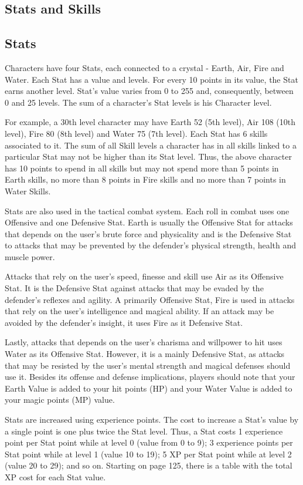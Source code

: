 \begin{multicols}{2}
\section{Stats and Skills}
\subsection{Stats}
Characters have four Stats, each connected
to a crystal - Earth, Air, Fire and Water. Each Stat
has a value and levels. For every 10 points in its
value, the Stat earns another level. Stat's value
varies from 0 to 255 and, consequently, between 0
and 25 levels. The sum of a character’s Stat levels
is his Character level.

For example, a 30th level character may
have Earth 52 (5th level), Air 108 (10th level), Fire
80 (8th level) and Water 75 (7th level). Each Stat
has 6 skills associated to it. The sum of all Skill
levels a character has in all skills linked to a
particular Stat may not be higher than its Stat level.
Thus, the above character has 10 points to spend
in all skills but may not spend more than 5 points
in Earth skills, no more than 8 points in Fire skills
and no more than 7 points in Water Skills.

Stats are also used in the tactical combat
system. Each roll in combat uses one Offensive
and one Defensive Stat. Earth is usually the
Offensive Stat for attacks that depends on the
user's brute force and physicality and is the
Defensive Stat to attacks that may be prevented by
the defender's physical strength, health and
muscle power.

Attacks that rely on the user's speed,
finesse and skill use Air as its Offensive Stat. It is
the Defensive Stat against attacks that may be
evaded by the defender's reflexes and agility. A
primarily Offensive Stat, Fire is used in attacks
that rely on the user's intelligence and magical
ability. If an attack may be avoided by the
defender's insight, it uses Fire as it Defensive Stat.

Lastly, attacks that depends on the user's
charisma and willpower to hit uses Water as its
Offensive Stat. However, it is a mainly Defensive
Stat, as attacks that may be resisted by the user's
mental strength and magical defenses should use
it. Besides its offense and defense implications,
players should note that your Earth Value is added
to your hit points (HP) and your Water Value is
added to your magic points (MP) value.

Stats are increased using experience
points. The cost to increase a Stat's value by a
single point is one plus twice the Stat level. Thus, a
Stat costs 1 experience point per Stat point while
at level 0 (value from 0 to 9); 3 experience points
per Stat point while at level 1 (value 10 to 19); 5
XP per Stat point while at level 2 (value 20 to 29);
and so on. Starting on page 125, there is a table
with the total XP cost for each Stat value.


\end{multicols}
